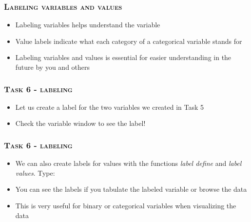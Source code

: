 \documentclass[10pt]{beamer}
\begin{document}
	\begin{frame}
		\frametitle{\textsc{Labeling variables and values}}
		\begin{itemize}	
			\item Labeling variables helps understand the variable 
			\item Value labels indicate what each category of a categorical variable stands for
			\item Labeling variables and values is essential for easier understanding in the future by you and others
		\end{itemize}
	\end{frame}
		
	\begin{frame}
		\frametitle{\textsc{Task 6 - labeling}}
		\begin{itemize}
			\item Let us create a label for the two variables we created in Task 5
		\end{itemize}
\begin{stlog}\end{stlog}
	
		\begin{itemize}
			\item Check the variable window to see the label!
		\end{itemize}		
	\end{frame}	
	

	\begin{frame}
		\frametitle{\textsc{Task 6 - labeling}}
		\begin{itemize}
		 	\item We can also create labels for values with the functions \textit{label define} and \textit{label values}. Type:
		\end{itemize}
\begin{stlog}\end{stlog}
	
		\begin{itemize}
	 		\item You can see the labels if you tabulate the labeled variable or browse the data
			\item This is very useful for binary or categorical variables when visualizing the data
		\end{itemize}		
	\end{frame}		
	
\end{document}
